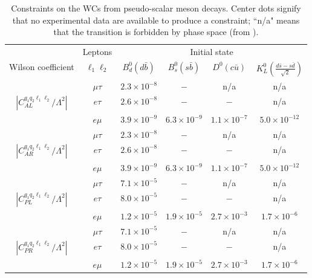 \documentclass[12pt]{article}
\begin{document}
\begin{table*}
\begin{center}
\footnotesize
\begin{tabular}{cccccc}
\hline \hline
 & Leptons &\multicolumn{4}{c}{Initial state}\\
 Wilson coefficient & $\ell_1 \ell_2$ & $B^0_d \left(d \bar b\right)$ & $B^0_s\left(s \bar b\right)$ & $D^0 \left(c \bar u\right)$ & $K^0_L \left(\frac{d \bar s - s \bar d}{\sqrt{2}}\right)$ \\ \hline
$~$ & $\mu \tau$ & $2.3 \times 10^{-8}$ & $-$ & n/a & n/a \\
%
$\left| {C_{AL}^{q_1 q_2 \ell_1\ell_2}}/{\Lambda^2} \right|$ & $e \tau$ & $2.6 \times 10^{-8}$ & $-$ & $-$ & n/a  \\
%
$~$ & $e \mu$ & $3.9 \times 10^{-9}$ & $6.3 \times 10^{-9}$ & $1.1 \times 10^{-7}$ & $5.0 \times 10^{-12}$ \\
\hline
$~$ & $\mu \tau$ & $2.3 \times 10^{-8}$ & $-$ & n/a & n/a \\
%
$\left| {C_{AR}^{q_1 q_2 \ell_1\ell_2}}/{\Lambda^2} \right|$ & $e \tau$ & $2.6 \times 10^{-8}$ & $-$ & $-$ & n/a \\
%
$~$ & $e \mu$ & $3.9 \times 10^{-9}$ & $6.3 \times 10^{-9}$ & $1.1 \times 10^{-7}$ & $5.0 \times 10^{-12}$ \\
\hline
$~$ & $\mu \tau$ & $7.1 \times 10^{-5}$ & $-$ & n/a & n/a \\
%
$\left| {C_{PL}^{q_1 q_2 \ell_1\ell_2}}/{\Lambda^2} \right|$ & $e \tau$ & $8.0 \times 10^{-5}$ & $-$ & $-$ & n/a \\
%
$~$ & $e \mu$ & $1.2 \times 10^{-5}$ & $1.9 \times 10^{-5}$ & $2.7 \times 10^{-3}$ & $1.7 \times 10^{-6}$ \\
\hline
$~$ & $\mu \tau$ & $7.1 \times 10^{-5}$ & $-$ & n/a & n/a \\
%
$\left| {C_{PR}^{q_1 q_2 \ell_1\ell_2}}/{\Lambda^2} \right|$ & $e \tau$ & $8.0 \times 10^{-5}$ & $-$ & $-$ & n/a \\
%
$~$ & $e \mu$ & $1.2 \times 10^{-5}$ & $1.9 \times 10^{-5}$ & $2.7 \times 10^{-3}$ & $1.7 \times 10^{-6}$ \\
\hline \hline
\end{tabular}
\end{center}
\caption{\label{tab:P4fermionq1q2}Constraints on the WCs from pseudo-scalar meson decays. Center dots signify that 
no experimental data are available to produce a constraint; ``n/a" means that the transition is forbidden by phase space (from \cite{HazardPetrovFuture}).}
\end{table*}
\end{document}
